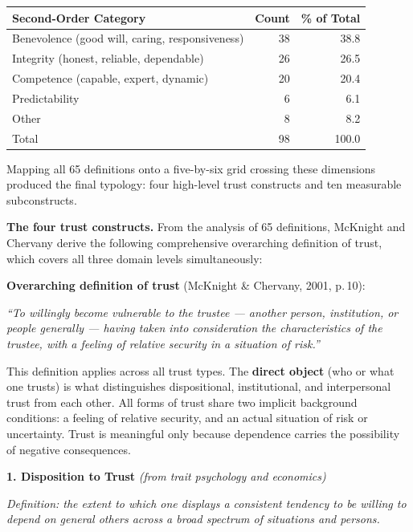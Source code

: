 \documentclass[11pt, a4paper]{article}
\begin{document}
\begin{center}
\small
\begin{tabular}{@{}lrr@{}}
\toprule
\textbf{Second-Order Category} & \textbf{Count} & \textbf{\% of Total} \\
\midrule
Benevolence (good will, caring, responsiveness) & 38 & 38.8 \\
Integrity (honest, reliable, dependable) & 26 & 26.5 \\
Competence (capable, expert, dynamic) & 20 & 20.4 \\
Predictability & 6 & 6.1 \\
Other & 8 & 8.2 \\
\midrule
Total & 98 & 100.0 \\
\bottomrule
\end{tabular}
\end{center}

Mapping all 65 definitions onto a five-by-six grid crossing these dimensions produced the final typology: four high-level trust constructs and ten measurable subconstructs.

\textbf{The four trust constructs.} From the analysis of 65 definitions, McKnight and Chervany derive the following comprehensive overarching definition of trust, which covers all three domain levels simultaneously:

\begin{infobox}
\small
\textbf{Overarching definition of trust} (McKnight \& Chervany, 2001, p.\,10):

\medskip
\textit{``To willingly become vulnerable to the trustee --- another person, institution, or people generally --- having taken into consideration the characteristics of the trustee, with a feeling of relative security in a situation of risk.''}

\medskip
This definition applies across all trust types. The \textbf{direct object} (who or what one trusts) is what distinguishes dispositional, institutional, and interpersonal trust from each other. All forms of trust share two implicit background conditions: a feeling of relative security, and an actual situation of risk or uncertainty. Trust is meaningful only because dependence carries the possibility of negative consequences.
\end{infobox}

\medskip
\noindent\textbf{1. Disposition to Trust} \quad \textit{(from trait psychology and economics)}

\medskip
\noindent\textit{Definition: the extent to which one displays a consistent tendency to be willing to depend on general others across a broad spectrum of situations and persons.}
\end{document}
